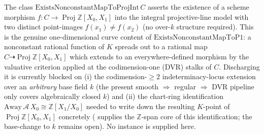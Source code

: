 \begin{definition}
  \label{def:adelic_nonconstant_projint_gate}
  \notready  %
  The class \(\mathrm{ExistsNonconstantMapToProjInt}\, C\) asserts the
  existence of a scheme morphism \(f \colon C \to \operatorname{Proj}
  \mathbb{Z}[X_0, X_1]\) into the integral projective-line model with
  two distinct point-images \(f(x_1) \ne f(x_2)\) (no over-\(k\)
  structure required). This is the genuine one-dimensional curve
  content of \(\mathrm{ExistsNonconstantMapToP1}\): a nonconstant
  rational function of \(K\) spreads out to a rational map
  \(C \dashrightarrow \operatorname{Proj} \mathbb{Z}[X_0, X_1]\) which
  extends to an everywhere-defined morphism by the valuative criterion
  applied at the codimension-one (DVR) stalks of \(C\). Discharging it
  is currently blocked on (i) the codimension-\(\ge 2\)
  indeterminacy-locus extension over an \emph{arbitrary} base field
  \(k\) (the present smooth \(\Rightarrow\) regular \(\Rightarrow\) DVR
  pipeline only covers algebraically closed \(k\)) and (ii) the
  chart-ring identification \(\mathrm{Away}\,\mathcal A\,X_0 \cong
  \mathbb{Z}[X_1/X_0]\) needed to write down the resulting \(K\)-point
  of \(\operatorname{Proj}\mathbb{Z}[X_0,X_1]\) concretely
  ( supplies the
  \(\mathbb{Z}\)-span core of this identification; the base-change to
  \(k\) remains open). No instance is supplied here.
\end{definition}

